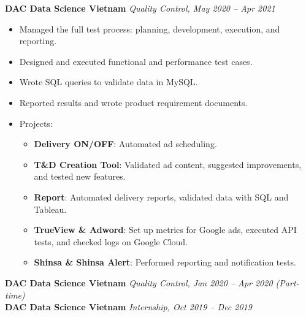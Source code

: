 \documentclass[11pt,a4paper]{article}
\begin{document}
    \textbf{DAC Data Science Vietnam} \hfill \textit{Quality Control, May 2020 -- Apr 2021}
    \begin{itemize}[leftmargin=1.5em]
        \item Managed the full test process: planning, development, execution, and reporting.
        \item Designed and executed functional and performance test cases.
        \item Wrote SQL queries to validate data in MySQL.
        \item Reported results and wrote product requirement documents.
        \item Projects:
        \begin{itemize}
            \item \textbf{Delivery ON/OFF}: Automated ad scheduling.
            \item \textbf{T\&D Creation Tool}: Validated ad content, suggested improvements, and tested new features.
            \item \textbf{Report}: Automated delivery reports, validated data with SQL and Tableau.
            \item \textbf{TrueView \& Adword}: Set up metrics for Google ads, executed API tests, and checked logs on Google Cloud.
            \item \textbf{Shinsa \& Shinsa Alert}: Performed reporting and notification tests.
        \end{itemize}
    \end{itemize}

    \vspace{1.5em}

    \textbf{DAC Data Science Vietnam} \hfill \textit{Quality Control, Jan 2020 -- Apr 2020 (Part-time)}\\
    \textbf{DAC Data Science Vietnam} \hfill \textit{Internship, Oct 2019 -- Dec 2019}

\end{document}
